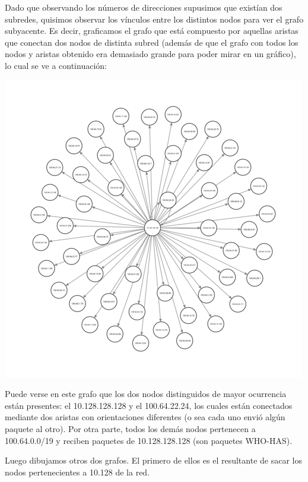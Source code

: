 Dado que observando los números de direcciones supusimos que existían dos
subredes, quisimos observar los vínculos entre los distintos nodos
para ver el grafo subyacente. Es decir, graficamos el grafo que está
compuesto por aquellas aristas que conectan dos nodos de distinta
subred (además de que el grafo con todos los nodos y aristas obtenido
era demasiado grande para poder mirar en un gráfico), lo cual se ve a
continuación:

\begin{center}
\includegraphics[scale=0.6]{../img/biblio-grafo-redesAB.png}
\end{center}

Puede verse en este grafo que los dos nodos distinguidos de mayor
ocurrencia están presentes: el 10.128.128.128 y el 100.64.22.24, los
cuales están conectados mediante dos aristas con orientaciones
diferentes (o sea cada uno envió algún paquete al otro). Por otra
parte, todos los demás nodos pertenecen a 100.64.0.0/19 y reciben
paquetes de 10.128.128.128 (son paquetes WHO-HAS).

Luego dibujamos otros dos grafos. El primero de ellos es el
resultante de sacar los nodos pertenecientes a 10.128 de la
red.

